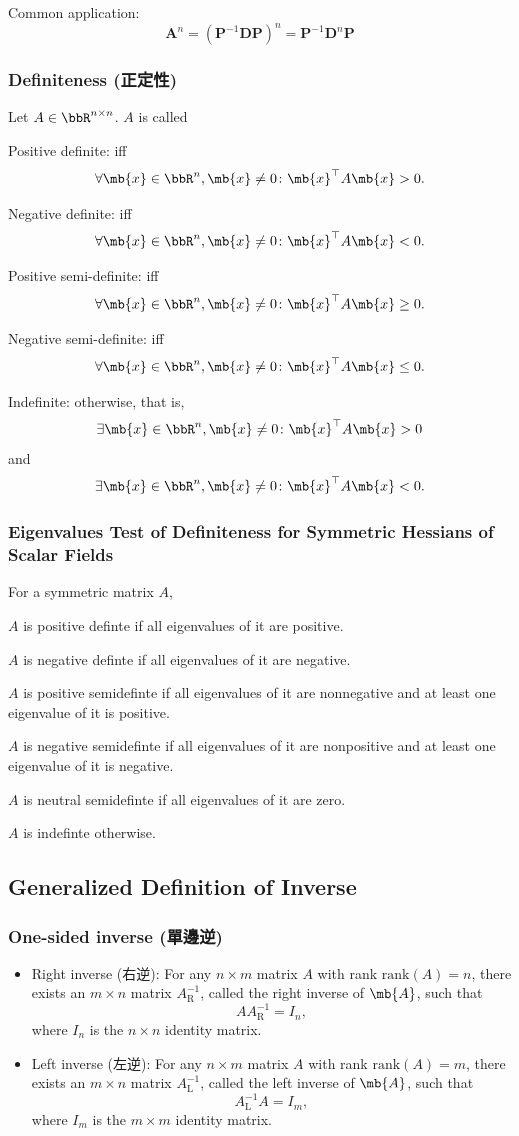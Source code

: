 \documentclass[a4paper,12pt]{report}
\begin{document}
Common application:
\[\mathbf{A}^n=(\mathbf{P}^{-1}\mathbf{D}\mathbf{P})^n=\mathbf{P}^{-1}\mathbf{D}^n\mathbf{P}\]
\subsubsection{Definiteness (正定性)}
Let $A\in\bbR^{n\times n}$. $A$ is called
\bit
\item Positive definite: iff
\[\forall\mb{x}\in\bbR^n,\mb{x}\ne 0\colon\mb{x}^\top A\mb{x}>0.\]
\item Negative definite: iff
\[\forall\mb{x}\in\bbR^n,\mb{x}\ne 0\colon\mb{x}^\top A\mb{x}<0.\]
\item Positive semi-definite: iff
\[\forall\mb{x}\in\bbR^n,\mb{x}\ne 0\colon\mb{x}^\top A\mb{x}\geq 0.\]
\item Negative semi-definite: iff
\[\forall\mb{x}\in\bbR^n,\mb{x}\ne 0\colon\mb{x}^\top A\mb{x}\leq 0.\]
\item Indefinite: otherwise, that is,
\[\exists\mb{x}\in\bbR^n,\mb{x}\ne 0\colon\mb{x}^\top A\mb{x}>0\]
and
\[\exists\mb{x}\in\bbR^n,\mb{x}\ne 0\colon\mb{x}^\top A\mb{x}<0.\]
\eit
\subsubsection{Eigenvalues Test of Definiteness for Symmetric Hessians of Scalar Fields}
For a symmetric matrix $A$,
\bit
\item $A$ is positive definte if all eigenvalues of it are positive.
\item $A$ is negative definte if all eigenvalues of it are negative.
\item $A$ is positive semidefinte if all eigenvalues of it are nonnegative and at least one eigenvalue of it is positive.
\item $A$ is negative semidefinte if all eigenvalues of it are nonpositive and at least one eigenvalue of it is negative.
\item $A$ is neutral semidefinte if all eigenvalues of it are zero.
\item $A$ is indefinte otherwise.
\eit
\subsection{Generalized Definition of Inverse}
\subsubsection{One-sided inverse (單邊逆)}
\begin{itemize}
\item Right inverse (右逆): For any $n\times m$ matrix $A$ with rank $\mathrm {rank}(A)=n$, there exists an $m\times n$ matrix $A_{\mathrm {R} }^{-1}$, called the right inverse of $\mb{A}$, such that
\[AA_{\mathrm {R} }^{-1}=I_{n},\]
where $I_{n}$ is the $n\times n$ identity matrix.
\item Left inverse (左逆): For any $n\times m$ matrix $A$ with rank $\mathrm {rank}(A)=m$, there exists an $m\times n$ matrix $A_{\mathrm {L} }^{-1}$, called the left inverse of $\mb{A}$, such that
\[A_{\mathrm {L} }^{-1}A=I_{m},\]
where $I_{m}$ is the $m\times m$ identity matrix.
\end{itemize}
\end{document}
